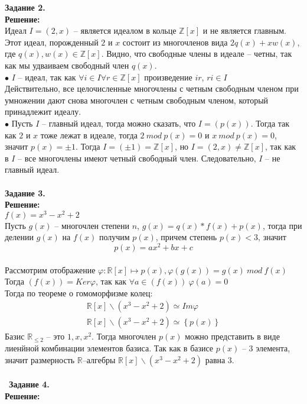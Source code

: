 \documentclass[12pt,a4paper]{scrartcl}
\begin{document}
	\indent
	\begin{flushright}	
		\textbf{}
	\end{flushright}
	\textbf{Задание 2.}\\
	\textbf{Решение:} 
	\\
	Идеал $I = (2, x)$ -- является идеалом в кольце $\mathbb{Z}[x]$ и не является главным.\\
	Этот идеал, порожденный $2$ и $x$ состоит из многочленов вида $2q(x) + xw(x)$, где $q(x), w(x) \in \mathbb{Z}[x]$. Видно, что свободные члены в идеале -- четны, так как мы удваиваем свободный член $q(x)$.\\
	$\bullet$
	$I$ -- идеал, так как $\forall i \in I \forall r \in \mathbb{Z}[x]$ произведение $ir$, $ri \in I$\\
	Действительно, все целочисленные многочлены с четным свободным членом при умножении дают снова многочлен с четным свободным членом, который принадлежит идеалу.\\
	$\bullet$ Пусть $I$ -- главный идеал, тогда можно сказать, что $I = (p(x))$. Тогда так как $2$ и $x$ тоже лежат в идеале, тогда $2~mod~p(x) = 0$ и $x~mod~p(x) = 0$, значит $p(x) = \pm 1$. Тогда $I = (\pm1) = \mathbb{Z}[x]$, но $I = (2, x) \neq \mathbb{Z}[x]$, так как в $I$ -- все многочлены имеют четный свободный член. Следовательно, $I$ -- не главный идеал.\\
	\\
	\textbf{Задание 3.} 
	\\
	\textbf{Решение:} 
	\\
	\indent
	$f(x) = x^3 - x^2 + 2$\\
	Пусть $g(x)$ -- многочлен степени $n$, $g(x) = q(x) * f(x) + p(x)$, тогда при делении $g(x)$ на $f(x)$ получим $p(x)$, причем степень $p(x) < 3$, значит\\
	$$p(x) = ax^2 +bx + c$$\\
	Рассмотрим отображение $\varphi: \mathbb{R}[x] \longmapsto p(x), \varphi(g(x)) = g(x)~mod~f(x)$\\
	Тогда $(f(x)) = Ker\varphi$, так как $\forall a \in (f(x))~ \varphi(a) = 0$\\
	Тогда по теореме о гомоморфизме колец:\\
	\begin{gather*}
	\mathbb{R}[x] \backslash (x^3 - x^2 + 2) \simeq Im\varphi \\
	\mathbb{R}[x] \backslash (x^3 - x^2 + 2) \simeq \left\{ p(x) \right\}
	\end{gather*}
	Базис $\mathbb{R}_{\leq 2}$ -- это $1, x, x^2$. Тогда многочлен $p(x)$ можно представить в виде лиенйной комбинации элементов базиса. Так как в базисе $p(x)$ -- $3$ элемента, значит размерность $\mathbb{R}$--алгебры $\mathbb{R}[x] \backslash (x^3 - x^2 + 2)$ равна 3.\\
	\\\	
	\textbf{Задание 4.} \\
	\textbf{Решение:} 
	\\
	\indent
	
\end{document}
